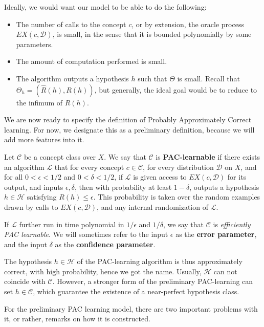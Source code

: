 Ideally, we would want our model to be able to do the following: 
\begin{itemize}[itemsep=1pt,topsep=1pt]
    \item The number of calls to the concept $c$, or by extension, the oracle process $EX(c,\mathcal{D})$, is small, in the sense that it is bounded polynomially by some parameters. 
    \item The amount of computation performed is small. 
    \item The algorithm outputs a hypothesis $h$ such that $\Theta$ is small. Recall that $\Theta_{h} = (\hat{R}(h),R(h))$, but generally, the ideal goal would be to reduce to the infimum of $R(h)$. 
\end{itemize}

We are now ready to specify the definition of Probably Approximately Correct learning. For now, we designate this as a preliminary definition, because we will add more features into it. 

\begin{definition}
    Let $\mathcal{C}$ be a concept class over $X$. We say that $\mathcal{C}$ is \textbf{PAC-learnable} if there exists an algorithm $\mathcal{L}$ that for every concept $c\in \mathcal{C}$, for every distribution $\mathcal{D}$ on $X$, and for all $0<\epsilon < 1/2$ and $0< \delta < 1/2$, if $\mathcal{L}$ is given access to $EX(c,\mathcal{D})$ for its output, and inputs $\epsilon, \delta$, then with probability at least $1-\delta$, outputs a hypothesis $h\in \mathcal{H}$ satisfying $R(h)\leq \epsilon$. This probability is taken over the random examples drawn by calls to $EX(c,\mathcal{D})$, and any internal randomization of $\mathcal{L}$. 

    If $\mathcal{L}$ further run in time polynomial in $1/\epsilon$ and $1/\delta$, we say that $\mathcal{C}$ is \textit{efficiently PAC learnable}. We will sometimes refer to the input $\epsilon$ as the \textbf{error parameter}, and the input $\delta$ as the \textbf{confidence parameter}.
\end{definition}

The hypothesis $h\in \mathcal{H}$ of the PAC-learning algorithm is thus approximately correct, with high probability, hence we got the name. Usually, $\mathcal{H}$ can not coincide with $\mathcal{C}$. However, a stronger form of the preliminary PAC-learning can set $h\in\mathcal{C}$, which guarantee the existence of a near-perfect hypothesis class. 

For the preliminary PAC learning model, there are two important problems with it, or rather, remarks on how it is constructed. 


